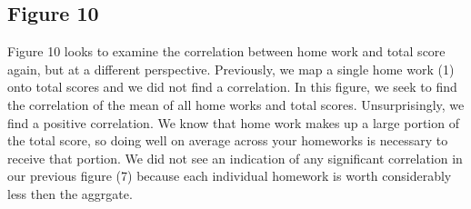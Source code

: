 \documentclass{article}
\begin{document}
\subsection{Figure 10}
Figure 10 looks to examine the correlation between home work and total score again, but at a different perspective. Previously, we map a single home work (1) onto total scores and we did not find a correlation. In this figure, we seek to find the correlation of the mean of all home works and total scores. Unsurprisingly, we find a positive correlation. We know that home work makes up a large portion of the total score, so doing well on average across your homeworks is necessary to receive that portion. We did not see an indication of any significant correlation in our previous figure (7) because each individual homework is worth considerably less then the aggrgate.
\end{document}
